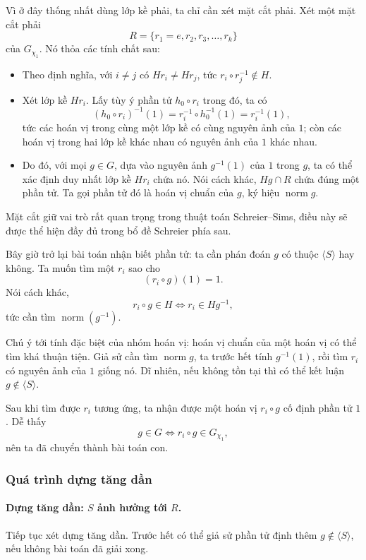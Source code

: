 \documentclass[11pt]{article}
\begin{document}
Vì ở đây thống nhất dùng lớp kề phải, ta chỉ cần xét mặt cắt phải. Xét một mặt
cắt phải
\[
  R=\{r_1=e,r_2,r_3,\ldots,r_k\}
\]
của \(G_{\chi_1}\). Nó thỏa các tính chất sau:
\begin{itemize}
  \item Theo định nghĩa, với \(i\ne j\) có \(Hr_i\ne Hr_j\), tức
  \(r_i\circ r_j^{-1}\notin H\).
  \item Xét lớp kề \(Hr_i\). Lấy tùy ý phần tử \(h_0\circ r_i\) trong đó, ta
  có
  \[
    (h_0\circ r_i)^{-1}(1)=r_i^{-1}\circ h_0^{-1}(1)=r_i^{-1}(1),
  \]
  tức các hoán vị trong cùng một lớp kề có cùng nguyên ảnh của \(1\); còn các
  hoán vị trong hai lớp kề khác nhau có nguyên ảnh của \(1\) khác nhau.
  \item Do đó, với mọi \(g\in G\), dựa vào nguyên ảnh \(g^{-1}(1)\) của \(1\)
  trong \(g\), ta có thể xác định duy nhất lớp kề \(Hr_i\) chứa nó. Nói cách
  khác, \(Hg\cap R\) chứa đúng một phần tử. Ta gọi phần tử đó là hoán vị chuẩn
  của \(g\), ký hiệu \(\operatorname{norm}g\).
\end{itemize}

Mặt cắt giữ vai trò rất quan trọng trong thuật toán Schreier--Sims, điều này sẽ
được thể hiện đầy đủ trong bổ đề Schreier phía sau.

Bây giờ trở lại bài toán nhận biết phần tử: ta cần phán đoán \(g\) có thuộc
\(\langle S\rangle\) hay không. Ta muốn tìm một \(r_i\) sao cho
\[
  (r_i\circ g)(1)=1.
\]
Nói cách khác,
\[
  r_i\circ g\in H \Longleftrightarrow r_i\in Hg^{-1},
\]
tức cần tìm \(\operatorname{norm}(g^{-1})\).

Chú ý tới tính đặc biệt của nhóm hoán vị: hoán vị chuẩn của một hoán vị có thể
tìm khá thuận tiện. Giả sử cần tìm \(\operatorname{norm}g\), ta trước hết tính
\(g^{-1}(1)\), rồi tìm \(r_i\) có nguyên ảnh của \(1\) giống nó. Dĩ nhiên, nếu
không tồn tại thì có thể kết luận \(g\notin\langle S\rangle\).

Sau khi tìm được \(r_i\) tương ứng, ta nhận được một hoán vị \(r_i\circ g\) cố
định phần tử \(1\). Dễ thấy
\[
  g\in G \Longleftrightarrow r_i\circ g\in G_{\chi_1},
\]
nên ta đã chuyển thành bài toán con.

\subsubsection{Quá trình dựng tăng dần}

\paragraph{Dựng tăng dần: \(S\) ảnh hưởng tới \(R\).}
Tiếp tục xét dựng tăng dần. Trước hết có thể giả sử phần tử định thêm
\(g\notin\langle S\rangle\), nếu không bài toán đã giải xong.
\end{document}
